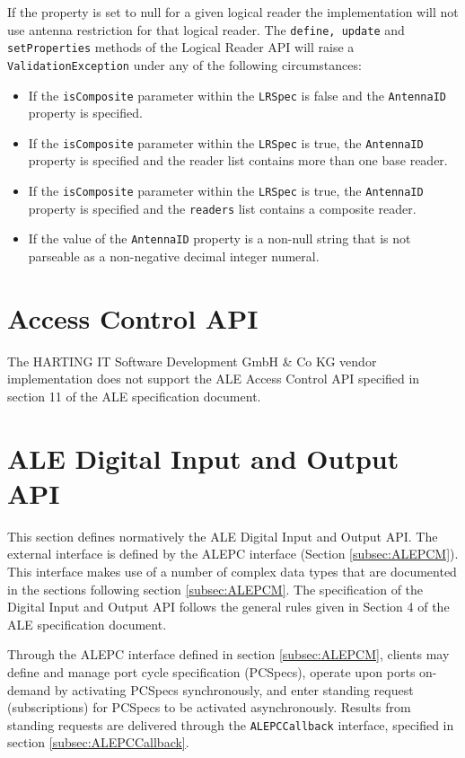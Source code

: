 \documentclass[11pt,a4paper,oneside]{article}
\begin{document}
If the property is set to null for a given logical reader the implementation will not use antenna restriction for that logical reader.
The \texttt{define, update} and \texttt{setProperties} methods of the Logical Reader API will raise a \texttt{ValidationException} under any of the following circumstances:

\begin{itemize}
\item	If the \texttt{isComposite} parameter within the \texttt{LRSpec} is false and the \ifpdf\newline\fi\texttt{AntennaID} property is specified.
\item	If the \texttt{isComposite} parameter within the \texttt{LRSpec} is true, the \texttt{AntennaID} property is specified and the reader list contains more than one base reader.
\item	If the \texttt{isComposite} parameter within the \texttt{LRSpec} is true, the \texttt{AntennaID} property is specified and the \texttt{readers} list contains a composite reader.
\item	If the value of the \texttt{AntennaID} property is a non-null string that is not parseable as a non-negative decimal integer numeral.
\end{itemize}

\section{Access Control API}
The HARTING IT Software Development GmbH \& Co KG vendor implementation does not support the ALE Access Control API specified in section 11 of the ALE specification document.

\section{ALE Digital Input and Output API}
\label{subsec:ALEdigi}
This section defines normatively the ALE Digital Input and Output API. The external interface is defined by the ALEPC interface (Section \ref{subsec:ALEPCM}). 
This interface makes use of a number of complex data types that are documented in the sections following section \ref{subsec:ALEPCM}. The specification of the Digital Input and Output API follows the general rules given in Section 4 of the ALE specification document.

Through the ALEPC interface defined in section \ref{subsec:ALEPCM}, clients may define and manage port cycle specification (PCSpecs), operate upon ports on-demand by activating PCSpecs synchronously, and enter standing request (subscriptions) for PCSpecs to be activated asynchronously. Results from standing requests are delivered through the \texttt{ALEPCCallback} interface, specified in section \ref{subsec:ALEPCCallback}.
\end{document}
